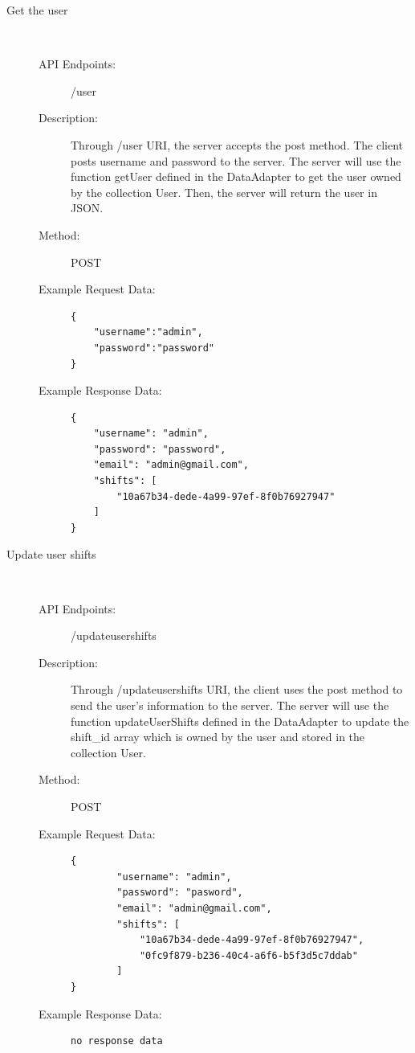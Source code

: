 \documentclass[11pt, oneside]{article}   	%
\begin{document}
\begin{description}
\item[Get the user]
\
\begin{description}
\item[API Endpoints:] /user
\item[Description:] Through /user URI, the server accepts the post method. The client posts username and password to the server. 
The server will use the function getUser defined in the DataAdapter to get the user owned by the collection User. Then, the server will return the user in JSON.
\item[Method:] POST
\item[Example Request Data:]
\begin{verbatim}
{
    "username":"admin",
    "password":"password"
}
\end{verbatim}
\item[Example Response Data:]
\begin{verbatim}
{
    "username": "admin",
    "password": "password",
    "email": "admin@gmail.com",
    "shifts": [
        "10a67b34-dede-4a99-97ef-8f0b76927947"
    ]
}
\end{verbatim}
\end{description}





\item[Update user shifts]
\
\begin{description}
\item[API Endpoints:] /updateusershifts
\item[Description:] Through /updateusershifts URI, the client uses the post method to send the user’s information to the server.
The server will use the function updateUserShifts defined in the DataAdapter to update the shift\_id array which is owned by the user and stored in the collection User.
\item[Method:] POST
\item[Example Request Data:]
\begin{verbatim}
{
        "username": "admin",
        "password": "pasword",
        "email": "admin@gmail.com",
        "shifts": [
            "10a67b34-dede-4a99-97ef-8f0b76927947",
            "0fc9f879-b236-40c4-a6f6-b5f3d5c7ddab"
        ]
}

\end{verbatim}
\item[Example Response Data:]
\begin{verbatim}
no response data
\end{verbatim}
\end{description}







\end{description}
\end{document}
